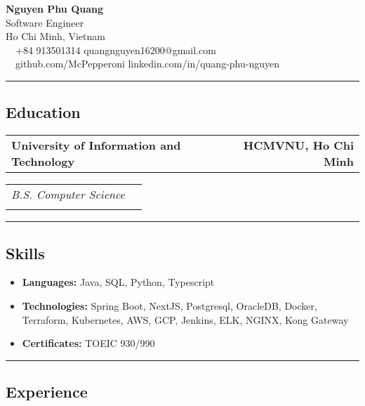 \documentclass[11pt,letterpaper]{article}
\makeatletter
\newcommand{\headerrow}[2]
{\begin{tabular*}{\linewidth}{l@{\extracolsep{\fill}}r}
#1 &
#2 \\
\end{tabular*}}
\makeatother
\begin{document}
\begin{center}
    {\LARGE \textbf{Nguyen Phu Quang}}\\
    \vspace{0.2cm}
    Software Engineer\\
    \vspace{0.2cm}
    Ho Chi Minh, Vietnam
    \vspace{0.5cm}
    \\
    \raisebox{-0.2\height} {\Large \faPhoneSquare} \ \  +84 913501314 \hfill quangnguyen16200@gmail.com \ \ \raisebox{-0.2\height}{\Large \faEnvelopeSquare}
    \\
    \raisebox{-0.2\height}{\Large \faGithubSquare} \ \ github.com/McPepperoni \hfill linkedin.com/in/quang-phu-nguyen \ \ \raisebox{-0.2\height}{\Large \faLinkedinSquare}
\end{center}
\hrule
\vspace{-1em}
\subsection*{\Large Education}
\headerrow
{\textbf{University of Information and Technology}}
{\textbf{HCMVNU, Ho Chi Minh}}
\headerrow
{\emph{B.S. Computer Science}}\\
\hrule
\vspace{-1em}
\subsection*{\Large Skills}
\begin{itemize}[leftmargin=1em,noitemsep]
    \item \textbf{Languages:}
          Java, SQL, Python, Typescript
    \item \textbf{Technologies:}
          Spring Boot, NextJS, Postgresql, OracleDB, Docker, Terraform, Kubernetes, AWS, GCP, Jenkins, ELK, NGINX, Kong Gateway
    \item \textbf{Certificates:}
          TOEIC 930/990
\end{itemize}
\hrule
\vspace{-1em}
\subsection*{\Large Experience}
\end{document}
